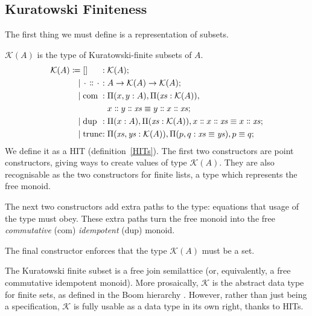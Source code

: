 \subsection{Kuratowski Finiteness}
The first thing we must define is a representation of subsets.
\begin{definition}
  \(\mathcal{K}(A)\) is the type of Kuratowski-finite subsets of \(A\).
  \begin{equation}
    \begin{alignedat}{3}
      \mathcal{K}(A) \coloneqq&
             \; []                &:& \; \mathcal{K}(A) ; \\
      \vert& \; \wc \dblcolon \wc &:& \; A \rightarrow \mathcal{K}(A) \rightarrow \mathcal{K}(A) ; \\
      \vert& \; \text{com}        &:& \; \Pi (x, y: A) , \Pi (\mathit{xs} : \mathcal{K}(A)) , \\
                                  &&& \; x \dblcolon y \dblcolon \mathit{xs} \equiv y \dblcolon x \dblcolon \mathit{xs} ; \\
      \vert& \; \text{dup}        &:& \; \Pi (x : A) , \Pi (\mathit{xs} : \mathcal{K}(A)) , x \dblcolon x \dblcolon \mathit{xs} \equiv x \dblcolon \mathit{xs} ; \\
      \vert& \; \text{trunc}      &:& \; \Pi (\mathit{xs}, \mathit{ys}: \mathcal{K}(A)) , \Pi (p, q : \mathit{xs} \equiv \mathit{ys}) , p \equiv q ;
    \end{alignedat}
  \end{equation}
  We define it as a HIT (definition~\ref{HITs}).
  The first two constructors are point constructors, giving ways to create
  values of type \(\mathcal{K}(A)\).
  They are also recognisable as the two constructors for finite lists, a type
  which represents the free monoid.

  The next two constructors add extra paths to the type: equations that usage of
  the type must obey.
  These extra paths turn the free monoid into the free \emph{commutative} (com)
  \emph{idempotent} (dup) monoid.

  The final constructor enforces that the type \(\mathcal{K}(A)\) must be a set.
\end{definition}
The Kuratowski finite subset is a free join semilattice (or, equivalently, a
free commutative idempotent monoid).
More prosaically, \(\mathcal{K}\) is the abstract data type for finite sets, as
defined in the Boom hierarchy \cite{boomFurtherThoughtsAbstracto1981,
  bunkenburgBoomHierarchy1994}.
However, rather than just being a specification, \(\mathcal{K}\) is fully usable
as a data type in its own right, thanks to HITs.

